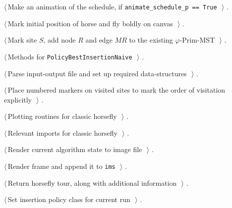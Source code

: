 \documentclass[11.5pt]{report}
\begin{document}
{\begin{list}{}{\setlength{\itemsep}{-\parsep}\setlength{\itemindent}{-\leftmargin}}
\item $\langle\,$Make an animation of the schedule, if \verb|animate_schedule_p == True|\nobreak\ {\footnotesize {}}$\,\rangle$ {\footnotesize {\NWtxtRefIn} .}
\item $\langle\,$Mark initial position of horse and fly boldly on canvas\nobreak\ {\footnotesize {}}$\,\rangle$ {\footnotesize {\NWtxtRefIn} .}
\item $\langle\,$Mark site $S$, add node $R$ and edge $MR$ to the existing $\varphi$-Prim-MST\nobreak\ {\footnotesize {}}$\,\rangle$ {\footnotesize {\NWtxtNoRef}.}
\item $\langle\,$Methods for \verb|PolicyBestInsertionNaive|\nobreak\ {\footnotesize {}}$\,\rangle$ {\footnotesize {\NWtxtRefIn} .}
\item $\langle\,$Parse input-output file and set up required data-structures\nobreak\ {\footnotesize {}}$\,\rangle$ {\footnotesize {\NWtxtRefIn} .}
\item $\langle\,$Place numbered markers on visited sites to mark the order of visitation explicitly\nobreak\ {\footnotesize {}}$\,\rangle$ {\footnotesize {\NWtxtRefIn} .}
\item $\langle\,$Plotting routines for classic horsefly\nobreak\ {\footnotesize {}}$\,\rangle$ {\footnotesize {\NWtxtRefIn} .}
\item $\langle\,$Relevant imports for classic horsefly\nobreak\ {\footnotesize {}}$\,\rangle$ {\footnotesize {\NWtxtRefIn} .}
\item $\langle\,$Render current algorithm state to image file\nobreak\ {\footnotesize {}}$\,\rangle$ {\footnotesize {\NWtxtRefIn} .}
\item $\langle\,$Render frame and append it to \verb|ims|\nobreak\ {\footnotesize {}}$\,\rangle$ {\footnotesize {\NWtxtRefIn} .}
\item $\langle\,$Return horsefly tour, along with additional information\nobreak\ {\footnotesize {}}$\,\rangle$ {\footnotesize {\NWtxtRefIn} .}
\item $\langle\,$Set insertion policy class for current run\nobreak\ {\footnotesize {}}$\,\rangle$ {\footnotesize {\NWtxtRefIn} .}

\end{list}}
\end{document}
